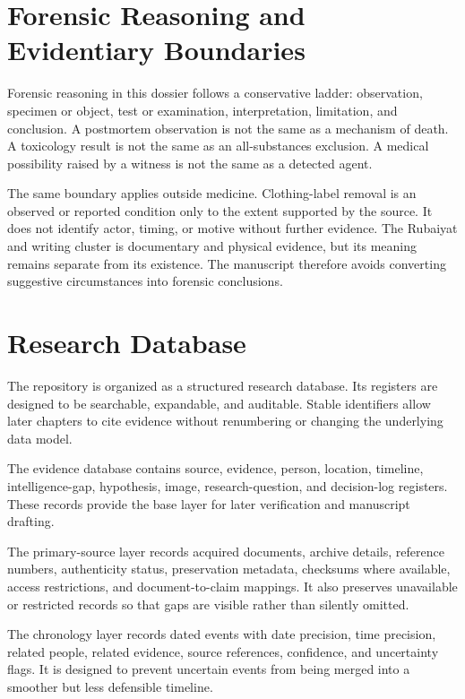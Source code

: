 \section{Forensic Reasoning and Evidentiary Boundaries}

Forensic reasoning in this dossier follows a conservative ladder: observation, specimen or object, test or examination, interpretation, limitation, and conclusion. A postmortem observation is not the same as a mechanism of death. A toxicology result is not the same as an all-substances exclusion. A medical possibility raised by a witness is not the same as a detected agent.

The same boundary applies outside medicine. Clothing-label removal is an observed or reported condition only to the extent supported by the source. It does not identify actor, timing, or motive without further evidence. The Rubaiyat and writing cluster is documentary and physical evidence, but its meaning remains separate from its existence. The manuscript therefore avoids converting suggestive circumstances into forensic conclusions.

\section{Research Database}

The repository is organized as a structured research database. Its registers are designed to be searchable, expandable, and auditable. Stable identifiers allow later chapters to cite evidence without renumbering or changing the underlying data model.

The evidence database contains source, evidence, person, location, timeline, intelligence-gap, hypothesis, image, research-question, and decision-log registers. These records provide the base layer for later verification and manuscript drafting.

The primary-source layer records acquired documents, archive details, reference numbers, authenticity status, preservation metadata, checksums where available, access restrictions, and document-to-claim mappings. It also preserves unavailable or restricted records so that gaps are visible rather than silently omitted.

The chronology layer records dated events with date precision, time precision, related people, related evidence, source references, confidence, and uncertainty flags. It is designed to prevent uncertain events from being merged into a smoother but less defensible timeline.

